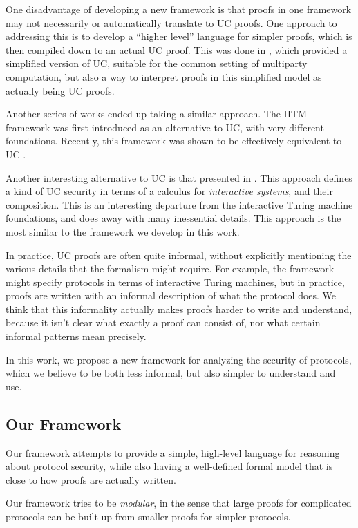 One disadvantage of developing a new framework is that
proofs in one framework may not necessarily
or automatically translate to UC proofs.
One approach to addressing this is to develop
a ``higher level'' language for simpler proofs,
which is then compiled down to an actual UC proof.
This was done in \cite{C:CanCohLin15},
which provided a simplified version of UC, suitable
for the common setting of multiparty computation,
but also a way to interpret proofs in this simplified
model as actually being UC proofs.

Another series of works ended up taking
a similar approach.
The IITM framework \cite{EPRINT:Kuesters06, JC:KusTueRau20a}
was first introduced as an alternative to UC, with very different foundations.
Recently, this framework was shown to be effectively equivalent to UC
\cite{EC:RauKusChe22}.

Another interesting alternative to UC is that presented in
\cite{cramer2015secure}.
This approach defines a kind of UC security in terms of
a calculus for \emph{interactive systems},
and their composition.
This is an interesting departure from the interactive Turing machine
foundations, and does away with many inessential details.
This approach is the most similar to the framework we develop
in this work.

In practice, UC proofs are often quite informal,
without explicitly mentioning the various details that the formalism
might require.
For example, the framework might specify protocols
in terms of interactive Turing machines, but in practice,
proofs are written with an informal description of what the protocol
does.
We think that this informality actually
makes proofs harder to write and understand,
because it isn't clear what exactly a proof can consist of,
nor what certain informal patterns mean precisely.

In this work, we propose a new framework for analyzing the security
of protocols, which we believe to be both less informal,
but also simpler to understand and use.

\subsection{Our Framework}

Our framework attempts to provide a simple, high-level language
for reasoning about protocol security, while also having
a well-defined formal model that is close to how proofs
are actually written.

Our framework tries to be \emph{modular}, in the sense that
large proofs for complicated protocols can be built up from smaller proofs
for simpler protocols.

